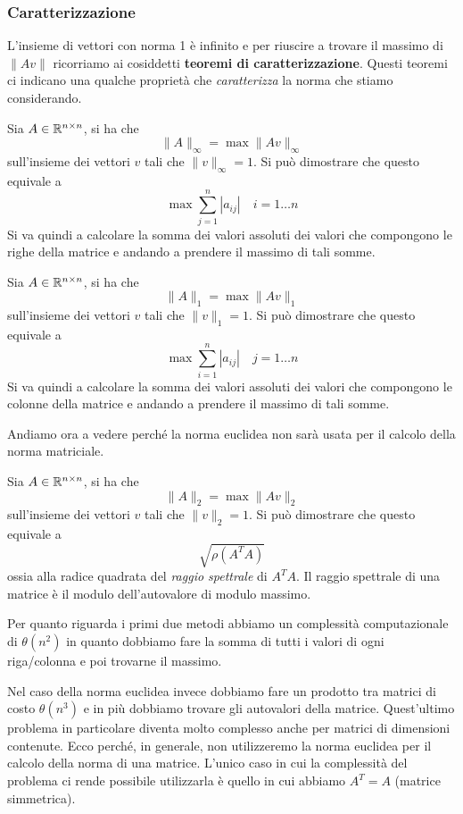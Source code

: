 \subsubsection{Caratterizzazione}
L'insieme di vettori con norma 1 è infinito e per riuscire a trovare il massimo di $\| A v \|$ ricorriamo ai
cosiddetti \textbf{teoremi di caratterizzazione}. Questi teoremi ci indicano una qualche  proprietà che
\emph{caratterizza} la norma che stiamo considerando.

\begin{theorem}
	Sia $A \in \mathbb{R}^{n \times n}$, si ha che
	\[ \| A \|_\infty = \max \| A v \|_\infty \]
	sull'insieme dei vettori $v$ tali che $\| v \|_\infty = 1$. Si può dimostrare che questo equivale a
	\[ \max \sum_{j=1}^n |a_{ij}| \quad i = 1 \dots n \]
	Si va quindi a calcolare la somma dei valori assoluti dei valori che compongono le righe della matrice e
	andando a prendere il massimo di tali somme.
\end{theorem}

\begin{theorem}
	Sia $A \in \mathbb{R}^{n \times n}$, si ha che
	\[ \| A \|_1 = \max \| A v \|_1 \]
	sull'insieme dei vettori $v$ tali che $\| v \|_1 = 1$. Si può dimostrare che questo equivale a
	\[ \max \sum_{i=1}^n |a_{ij}| \quad j = 1 \dots n \]
	Si va quindi a calcolare la somma dei valori assoluti dei valori che compongono le colonne della matrice e
	andando a prendere il massimo di tali somme.
\end{theorem}

Andiamo ora a vedere perché la norma euclidea non sarà usata per il calcolo della norma matriciale.

\begin{theorem}
	Sia $A \in \mathbb{R}^{n \times n}$, si ha che
	\[ \| A \|_2 = \max \| A v \|_2 \]
	sull'insieme dei vettori $v$ tali che $\| v \|_2 = 1$. Si può dimostrare che questo equivale a
	\[ \sqrt{\rho (A^T A)} \]
	ossia alla radice quadrata del \emph{raggio spettrale} di $A^T A$. Il raggio spettrale di una matrice è il
	modulo dell'autovalore di modulo massimo.
\end{theorem}

Per quanto riguarda i primi due metodi abbiamo un complessità computazionale di $\theta (n^2)$ in quanto dobbiamo
fare la somma di tutti i valori di ogni riga/colonna e poi trovarne il massimo.

Nel caso della norma euclidea invece dobbiamo fare un prodotto tra matrici di costo $\theta (n^3)$ e in più
dobbiamo trovare gli autovalori della matrice. Quest'ultimo problema in particolare diventa molto complesso anche
per matrici di dimensioni contenute. Ecco perché, in generale, non utilizzeremo la norma euclidea per il calcolo
della norma di una matrice. L'unico caso in cui la complessità del problema ci rende possibile utilizzarla è
quello in cui abbiamo $A^T = A$ (matrice simmetrica).
